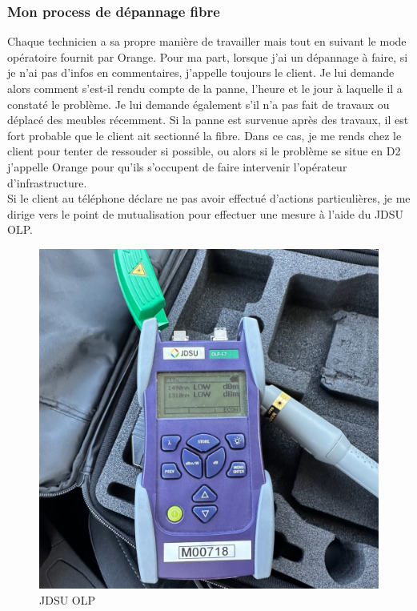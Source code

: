 \documentclass[12pt, a4paper]{article}
\begin{document}
\subsubsection{Mon process de dépannage fibre}
Chaque technicien a sa propre manière de travailler mais tout en 
suivant le mode opératoire fournit par Orange. Pour ma part, 
lorsque j'ai un dépannage à faire, si je n'ai pas d'infos en commentaires,
j'appelle toujours le client. Je lui demande alors comment s'est-il
rendu compte de la panne, l'heure et le jour à laquelle il a 
constaté le problème. Je lui demande également s'il n'a pas fait de travaux
ou déplacé des meubles récemment. Si la panne est survenue après
des travaux, il est fort probable que le client ait sectionné la fibre.
Dans ce cas, je me rends chez le client pour tenter de ressouder si possible, 
ou alors si le problème se situe
en \gls{D2}
j'appelle Orange pour qu'ils s'occupent de faire intervenir l'opérateur
d'infrastructure.\\

Si le client au téléphone déclare ne pas avoir
effectué d'actions particulières, je me dirige
vers le point de mutualisation pour effectuer
une mesure à l'aide du JDSU OLP.\\

\begin{figure}[h]
	\centering
	\includegraphics[scale=0.2]{img/olp.jpg}
	\caption{JDSU OLP}
\end{figure}
\end{document}

